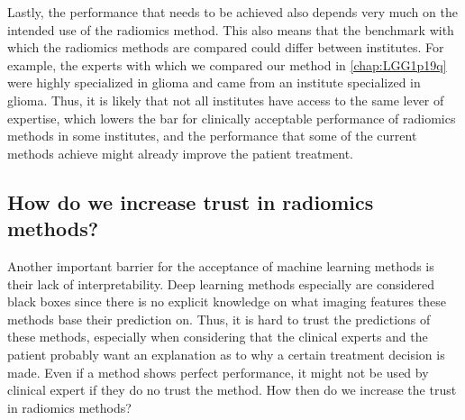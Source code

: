 Lastly, the performance that needs to be achieved also depends very much on the intended use of the radiomics method.
This also means that the benchmark with which the radiomics methods are compared could differ between institutes.
For example, the experts with which we compared our method in \cref{chap:LGG1p19q} were highly specialized in glioma and came from an institute specialized in glioma.
Thus, it is likely that not all institutes have access to the same lever of expertise, which lowers the bar for clinically acceptable performance of radiomics methods in some institutes, and the performance that some of the current methods achieve might already improve the patient treatment.

\subsection{How do we increase trust in radiomics methods?}

Another important barrier for the acceptance of machine learning methods is their lack of interpretability.
Deep learning methods especially are considered black boxes since there is no explicit knowledge on what imaging features these methods base their prediction on.
Thus, it is hard to trust the predictions of these methods, especially when considering that the clinical experts and the patient probably want an explanation as to why a certain treatment decision is made.
Even if a method shows perfect performance, it might not be used by clinical expert if they do no trust the method.
How then do we increase the trust in radiomics methods?

